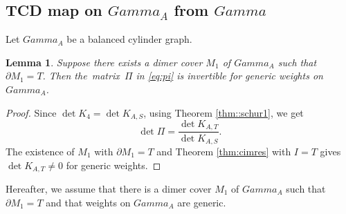 \documentclass[10pt,a4paper]{amsart}
\numberwithin{equation}{section}
\newtheorem{Lemma}[Theorem]{Lemma}
\newcommand{\A}{{\mathbb A}}
\newcommand{\la}{\label}
\def\boldsymbol#1{#1}
\def\A{A}
\def\Gamma{Gamma}
\def\widehat#1{#1}
\begin{document}
	
	\subsection[TCD map on Gamma\_\{widehat A\} from Gamma]{TCD map on $\boldsymbol{\Gamma_{\widehat \A}}$ from $\boldsymbol{\Gamma}$}
	\la{subsec:tcd}
	
	Let $\Gamma_\A$ be a balanced cylinder graph.
	
	\begin{Lemma} \la{lem:m1}
		Suppose there exists a dimer cover $M_1$ {of $\Gamma_\A$} such that $\partial M_1=T$. Then the~matrix~$\Pi$ in \eqref{eq:pi} is invertible for generic weights on $\Gamma_\A$.
	\end{Lemma}
	\begin{proof}
		Since $\det K_4=\det K_{\A,S}$, using Theorem \ref{thm::schur1}, we get
		\[
		\det \Pi=\frac{\det K_{\A,T}}{\det K_{\A,S}}.
		\]
		The existence of $M_1$ with $\partial M_1=T$ and Theorem \ref{thm:cimres} with $I=T$ gives $\det K_{\A,T} \neq 0$ for generic weights.
	\end{proof}
	
	
	Hereafter, we assume that there is a dimer cover $M_1$ of $\Gamma_\A$ such that $\partial M_1=T$ and that weights on $\Gamma_\A$ are generic.
	
\end{document}
